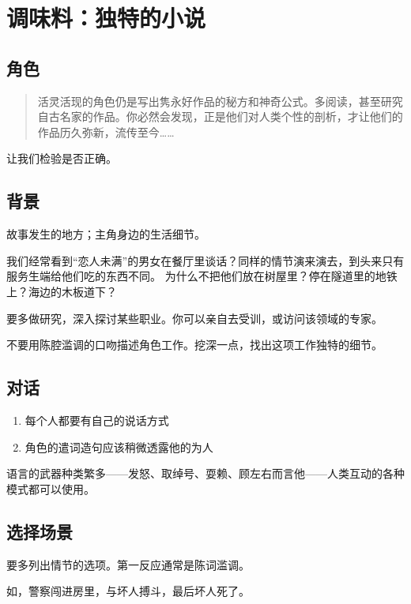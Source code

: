 \documentclass[11pt, twoside, hidelinks]{memoir}
\begin{document}
\section{调味料：独特的小说}
\label{sec:org0cdfc9c}
\subsection{角色}
\label{sec:org3c30a47}
\begin{quote}
活灵活现的角色仍是写出隽永好作品的秘方和神奇公式。多阅读，甚至研究自古名家的作品。你必然会发现，正是他们对人类个性的剖析，才让他们的作品历久弥新，流传至今……
\end{quote}

让我们检验是否正确。
\subsection{背景}
\label{sec:org21d216d}
故事发生的地方；主角身边的生活细节。

我们经常看到“恋人未满”的男女在餐厅里谈话？同样的情节演来演去，到头来只有服务生端给他们吃的东西不同。
为什么不把他们放在树屋里？停在隧道里的地铁上？海边的木板道下？

要多做研究，深入探讨某些职业。你可以亲自去受训，或访问该领域的专家。

不要用陈腔滥调的口吻描述角色工作。挖深一点，找出这项工作独特的细节。
\subsection{对话}
\label{sec:orga488979}
\begin{enumerate}
\item 每个人都要有自己的说话方式
\item 角色的遣词造句应该稍微透露他的为人
\end{enumerate}


语言的武器种类繁多——发怒、取绰号、耍赖、顾左右而言他——人类互动的各种模式都可以使用。
\subsection{选择场景}
\label{sec:org9fa7068}

要多列出情节的选项。第一反应通常是陈词滥调。

如，警察闯进房里，与坏人搏斗，最后坏人死了。
\end{document}
